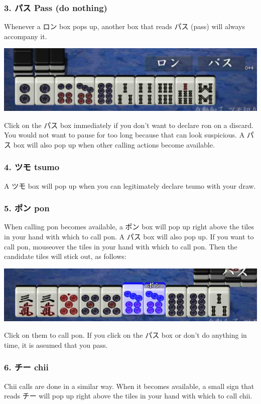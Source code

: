 \subsubsection{3. パス Pass (do nothing)}
Whenever a ロン box pops up, another box that reads パス (pass) will always accompany it. 
\begin{center}
\includegraphics[width=.7\textwidth,clip]{figs/ron.jpg}
\end{center}
Click on the パス box immediately if you don't want to declare {\jap ron} on a discard. You would not want to pause for too long because that can look suspicious. A パス box will also pop up when other calling actions become available. 

\subsubsection{4. ツモ {\jap tsumo} \textipa{[ts\'umo]}}
A ツモ box will pop up when you can legitimately declare {\jap tsumo} with your draw. 

\subsubsection{5. ポン {\jap pon} \textipa{[p\'\textopeno\ng]}}
When calling {\jap pon} becomes available, a ポン box will pop up right above the tiles in your hand with which to call {\jap pon}. A パス box will also pop up. If you want to call {\jap pon}, mouseover the tiles in your hand with which to call {\jap pon}. Then the candidate tiles will stick out, as follows:
\begin{center}
\includegraphics[width=.7\textwidth,clip]{figs/pung.jpg}
\end{center}
Click on them to call {\jap pon}. If you click on the パス box or don't do anything in time, it is assumed that you pass. 

\subsubsection{6. チー {\jap chii} }
{\jap Chii} calls are done in a similar way. When it becomes available, a small sign that reads チー will pop up right above the tiles in your hand with which to call {\jap chii}. 

